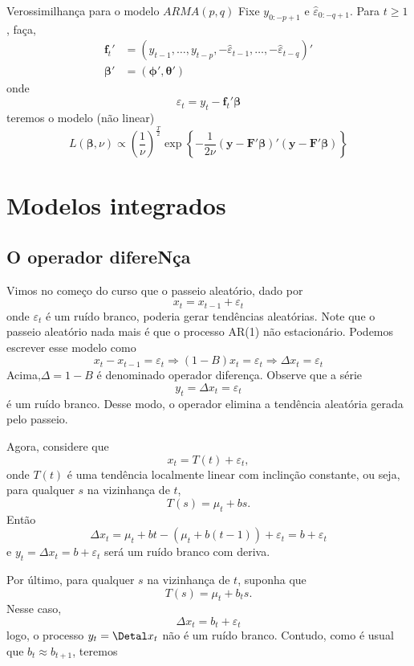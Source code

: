 \documentclass[
  letterpaper,
  DIV=11,
  numbers=noendperiod]{scrartcl}
\theoremstyle{definition}
\theoremstyle{definition}
\theoremstyle{plain}
\theoremstyle{plain}
\theoremstyle{remark}
\begin{document}
\begin{frame}{Verossimilhança para o modelo $ARMA(p,q)$}
    Fixe $y_{0:-p+1}$ e $\hat{\varepsilon}_{0:-q+1}$. Para $t\geq 1$, faça,
    \begin{align}
    \bm{f}_t'&= \left(y_{t-1},\ldots,y_{t-p} , -\hat{\varepsilon}_{t-1},\ldots,-\hat{\varepsilon}_{t-q} \right)'\\
    \bm{\beta}'&=\left(\bm{\phi}',\bm{\theta}'\right)
    \end{align}
    onde
    $$\hat{\varepsilon}_t = y_t - \bm{f}_t'\bm{\beta}  $$
    teremos o modelo (não linear)
    $$L(\bm{\beta},\nu)\propto \left(\frac{1}{\nu}\right)^{\frac{T}{2}}\exp\left\{-\frac{1}{2\nu}\left(\bm{y}-\bm{F}'\bm{\beta}\right)'\left(\bm{y}-\bm{F}'\bm{\beta}\right)\right\}$$
\end{frame}

\section{Modelos integrados}\label{modelos-integrados}

\subsection{O operador difereNça}\label{o-operador-diferenuxe7a}

Vimos no começo do curso que o passeio aleatório, dado por
\[x_t=x_{t-1}+\varepsilon_t\] onde \(\varepsilon_t\) é um ruído branco,
poderia gerar tendências aleatórias. Note que o passeio aleatório nada
mais é que o processo AR(1) não estacionário. Podemos escrever esse
modelo como
\[x_t-x_{t-1}=\varepsilon_t\Rightarrow(1-B)x_t=\varepsilon_t\Rightarrow\Delta x_t=\varepsilon_t\]
Acima,\(\Delta=1-B\) é denominado operador diferença. Observe que a
série \[y_t=\Delta x_t=\varepsilon_t\] é um ruído branco. Desse modo, o
operador elimina a tendência aleatória gerada pelo passeio.

Agora, considere que \[x_t=T(t)+\varepsilon_t,\] onde \(T(t)\) é uma
tendência localmente linear com inclinção constante, ou seja, para
qualquer \(s\) na vizinhança de \(t\), \[T(s)=\mu_t+b s.\] Então
\[\Delta x_t= \mu_t+bt-(\mu_t+b(t-1))+\varepsilon_t=b+\varepsilon_t\] e
\(y_t=\Delta x_t=b+\varepsilon_t\) será um ruído branco com deriva.

Por último, para qualquer \(s\) na vizinhança de \(t\), suponha que
\[T(s)=\mu_t+b_t s.\] Nesse caso, \[\Delta x_t= b_t+\varepsilon_t\]
logo, o processo \(y_t=\Detal x_t\) não é um ruído branco. Contudo, como
é usual que \(b_t\approx b_{t+1}\), teremos
\end{document}
